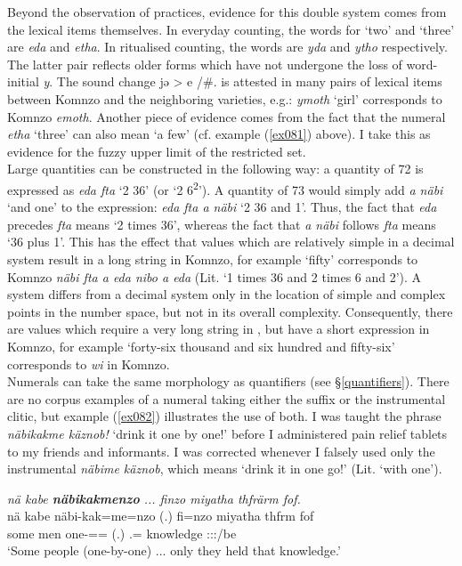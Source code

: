 Beyond the observation of practices, evidence for this double system comes from the lexical items themselves. In everyday counting, the words for `two' and `three' are \emph{eda} and \emph{etha}. In ritualised counting, the words are \emph{yda} and \emph{ytho} respectively. The latter pair reflects older forms which have not undergone the loss of word-initial \emph{y}. The sound change jə > e /\#. is attested in many pairs of lexical items between Komnzo and the neighboring  varieties, e.g.:  \emph{ymoth} `girl' corresponds to Komnzo \emph{emoth}. Another piece of evidence comes from the fact that the numeral \emph{etha} `three' can also mean `a few' (cf. example (\ref{ex081}) above). I take this as evidence for the fuzzy upper limit of the restricted set.\\

Large quantities can be constructed in the following way: a quantity of 72 is expressed as \emph{eda fta} `2 36' (or `2 6\textsuperscript{2}'). A quantity of 73 would simply add \emph{a näbi} `and one' to the expression: \emph{eda fta a näbi} `2 36 and 1'. Thus, the fact that \emph{eda} precedes \emph{fta} means `2 times 36', whereas the fact that \emph{a näbi} follows \emph{fta} means `36 plus 1'. This has the effect that values which are relatively simple in a decimal system result in a long string in Komnzo, for example  `fifty' corresponds to Komnzo \emph{näbi fta a eda nibo a eda} (Lit. `1 times 36 and 2 times 6 and 2'). A  system differs from a decimal system only in the location of simple and complex points in the number space, but not in its overall complexity. Consequently, there are values which require a very long string in , but have a short expression in Komnzo, for example `forty-six thousand and six hundred and fifty-six' corresponds to \emph{wi} in Komnzo.\\

Numerals can take the same morphology as quantifiers (see \S{}\ref{quantifiers}). There are no corpus examples of a numeral taking either the  suffix or the instrumental  clitic, but example (\ref{ex082}) illustrates the use of both. I was taught the phrase \emph{näbikakme käznob!} `drink it one by one!' before I administered pain relief tablets to my friends and informants. I was corrected whenever I falsely used only the instrumental \emph{näbime käznob}, which means `drink it in one go!' (Lit. `with one').

\begin{exe}
	\ex \emph{nä kabe \textbf{näbikakmenzo} ... finzo miyatha thfrärm fof.}\\
	\gll nä kabe näbi-kak=me=nzo (.) fi=nzo miyatha thfrm fof\\
	some men one-\Distr{}=\Ins{}=\Only{} (.) \Third.\Abs{}=\Only{} knowledge \Stpl{}:\Sbj:\Pst{}:\Dur{}/be \Emph{}\\
	\trans `Some people (one-by-one) ... only they held that knowledge.'\\
	\label{ex082}
\end{exe}

